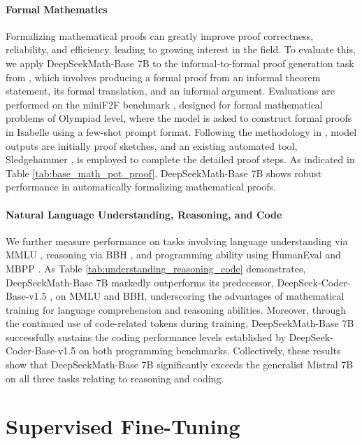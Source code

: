 \paragraph{Formal Mathematics}

Formalizing mathematical proofs can greatly improve proof correctness, reliability, and efficiency, leading to growing interest in the field. To evaluate this, we apply DeepSeekMath-Base 7B to the informal-to-formal proof generation task from \citep{dsp_proof}, which involves producing a formal proof from an informal theorem statement, its formal translation, and an informal argument. Evaluations are performed on the miniF2F benchmark \citep{minif2f}, designed for formal mathematical problems of Olympiad level, where the model is asked to construct formal proofs in Isabelle using a few-shot prompt format. Following the methodology in \cite{dsp_proof}, model outputs are initially proof sketches, and an existing automated tool, Sledgehammer \citep{sledgehammer}, is employed to complete the detailed proof steps. As indicated in Table \ref{tab:base_math_pot_proof}, DeepSeekMath-Base 7B shows robust performance in automatically formalizing mathematical proofs.

\paragraph{Natural Language Understanding, Reasoning, and Code}

We further measure performance on tasks involving language understanding via MMLU \citep{mmlu}, reasoning via BBH \citep{bbh}, and programming ability using HumanEval \citep{codex} and MBPP \citep{mbpp}. As Table \ref{tab:understanding_reasoning_code} demonstrates, DeepSeekMath-Base 7B markedly outperforms its predecessor, DeepSeek-Coder-Base-v1.5 \citep{deepseek-coder}, on MMLU and BBH, underscoring the advantages of mathematical training for language comprehension and reasoning abilities. Moreover, through the continued use of code-related tokens during training, DeepSeekMath-Base 7B successfully sustains the coding performance levels established by DeepSeek-Coder-Base-v1.5 on both programming benchmarks. Collectively, these results show that DeepSeekMath-Base 7B significantly exceeds the generalist Mistral 7B \citep{mistral} on all three tasks relating to reasoning and coding.

\section{Supervised Fine-Tuning}

